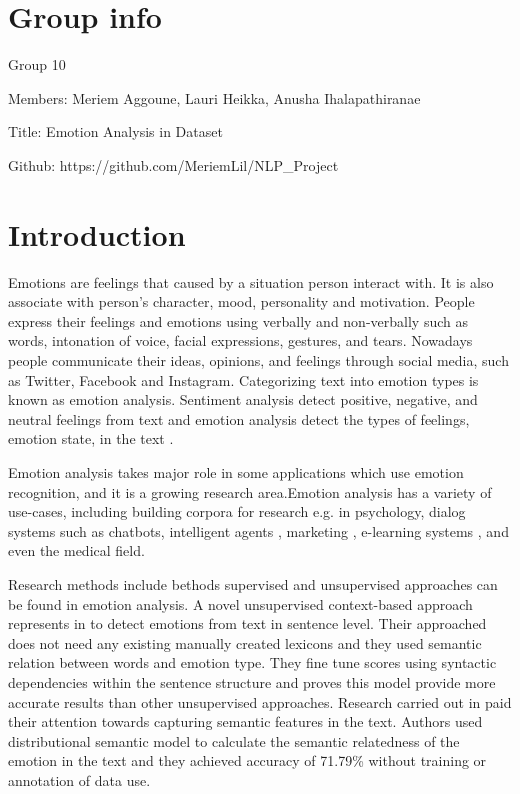 \documentclass[conference]{IEEEtran}
\begin{document}
\section{Group info}
Group 10

Members: Meriem Aggoune, Lauri Heikka, Anusha Ihalapathiranae

Title: Emotion Analysis in Dataset

Github: https://github.com/MeriemLil/NLP\_Project

\section{Introduction}
Emotions are feelings that caused by a situation person interact with. It is also associate with person’s character, mood, personality and motivation. People express their feelings and emotions using verbally and non-verbally such as words, intonation of voice, facial expressions, gestures, and tears. Nowadays people communicate their ideas, opinions, and feelings through social media, such as Twitter, Facebook and Instagram. Categorizing text into emotion types is known as emotion analysis. Sentiment analysis detect positive, negative, and neutral feelings from text and emotion analysis detect the types of feelings, emotion state, in the text \cite{emotiondetection}. 

Emotion analysis takes major role in some applications which use emotion recognition, and it is a growing research area.Emotion analysis has a variety of use-cases, including building corpora for research e.g. in psychology, dialog systems such as chatbots, intelligent agents \cite{klinger2018analysis}, marketing \cite{businesscase}, e-learning systems \cite{elearning}, and even the medical field\cite{calvo2017natural}.

 Research methods include bethods supervised and unsupervised approaches can be found in emotion analysis. A novel unsupervised context-based approach represents in \cite{unsupervisedemotiondetection} to detect emotions from text in sentence level. Their approached does not need any existing manually created lexicons and they used semantic relation between words and emotion type. They fine tune scores using syntactic dependencies within the sentence structure and proves this model provide more accurate results than other unsupervised approaches. Research carried out in \cite{jan2020emotion} paid their attention towards capturing semantic features in the text. Authors used distributional semantic model to calculate the semantic relatedness of the emotion in the text and they achieved accuracy of 71.79\% without training or annotation of data use.
\end{document}
